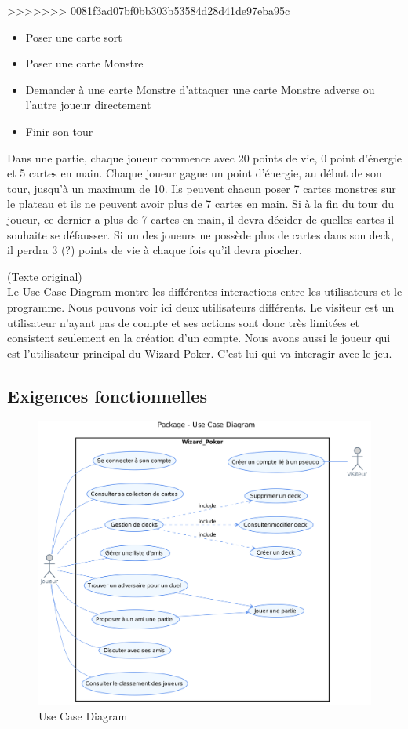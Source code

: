 \documentclass[11pt,a4paper]{article}
\begin{document}
>>>>>>> 0081f3ad07bf0bb303b53584d28d41de97eba95c
\begin{itemize}
 \item[\textbullet] Poser une carte sort
 \item[\textbullet] Poser une carte Monstre
 \item[\textbullet] Demander à une carte Monstre d'attaquer une carte Monstre adverse ou l'autre joueur directement
 \item[\textbullet] Finir son tour
\end{itemize}
Dans une partie, chaque joueur commence avec 20 points de vie, 0 point d'énergie et 5 cartes en main. Chaque joueur gagne un point d'énergie, au début de son tour, jusqu'à un maximum de 10.
Ils peuvent chacun poser 7 cartes monstres sur le plateau et ils ne peuvent avoir plus de 7 cartes en main. Si à la fin du tour du joueur, ce dernier a plus de 7 cartes en main, il devra décider de quelles cartes il souhaite se défausser.
Si un des joueurs ne possède plus de cartes dans son deck, il perdra 3 (?) points de vie à chaque fois qu'il devra piocher.



(Texte original)\\
Le Use Case Diagram montre les différentes interactions entre les
utilisateurs et le programme.  Nous pouvons voir ici deux utilisateurs
différents.  Le visiteur est un utilisateur n'ayant pas de compte et ses
actions sont donc très limitées et consistent seulement en la création d'un compte.
Nous avons aussi le joueur qui est l'utilisateur principal du Wizard Poker.
C'est lui qui va interagir avec le jeu.

\subsection{Exigences fonctionnelles}
\label{sec:exi-fonc}
\begin{figure}[ht]
  \centering
  \includegraphics[width=1\textwidth]{../uml_files/UseCaseDiagram.png}
  \caption{\label{fig:usecasebesoin} Use Case Diagram}
\end{figure}
\end{document}
